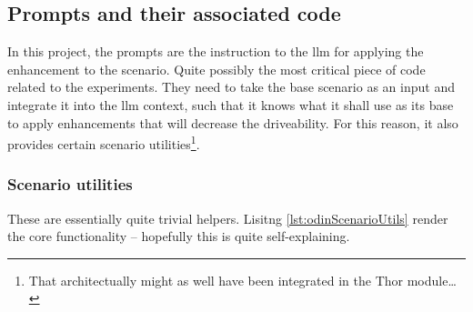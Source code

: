 \subsection{Prompts and their associated code}

In this project, the prompts are the instruction to the \acrfull{llm} for
applying the enhancement to the scenario. Quite possibly the most critical piece
of code related to the experiments. They need to take the base scenario as an
input and integrate it into the \acrshort{llm} context, such that it knows what
it shall use as its base to apply enhancements that will decrease the
driveability. For this reason, it also provides certain scenario
utilities\footnote{That architectually might as well have been integrated in the
Thor module\ldots}.

\subsubsection{Scenario utilities}

These are essentially quite trivial helpers. Lisitng \ref{lst:odinScenarioUtils}
render the core functionality -- hopefully this is quite self-explaining. 

